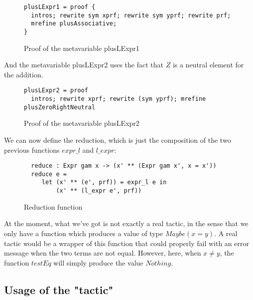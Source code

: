 \begin{figure}[H]
\figrule
\begin{center}
\begin{verbatim}
plusLExpr1 = proof {
  intros; rewrite sym xprf; rewrite sym yprf; rewrite prf;
  mrefine plusAssociative;
}
\end{verbatim}
\end{center}
\caption{Proof of the metavariable plusLExpr1}
\figrule
\end{figure}

And the metavariable plusLExpr2 uses the fact that $Z$ is a neutral element for the addition.

\begin{figure}[H]
\figrule
\begin{center}
\begin{verbatim}
plusLExpr2 = proof
  intros; rewrite xprf; rewrite (sym yprf); mrefine plusZeroRightNeutral
\end{verbatim}
\end{center}
\caption{Proof of the metavariable plusLExpr2}
\figrule
\end{figure}

We can now define the reduction, which is just the composition of the two previous functions $expr\_l$ and $l\_expr$:

\begin{figure}[H]
\figrule
\begin{center}
\begin{verbatim}
  reduce : Expr gam x -> (x' ** (Expr gam x', x = x'))
  reduce e = 
     let (x' ** (e', prf)) = expr_l e in
         (x' ** (l_expr e', prf))
\end{verbatim}
\end{center}
\caption{Reduction function}
\figrule
\end{figure}


At the moment, what we've got is not exactly a real tactic, in the sense that we only have a function which produces a value of type $Maybe (x = y)$. A real tactic would be a wrapper of this function that could properly fail with an error message when the two terms are not equal. However, here, when $x\ne y$, the function $testEq$ will simply produce the value $Nothing$. \\

\subsection{Usage of the "tactic"}

